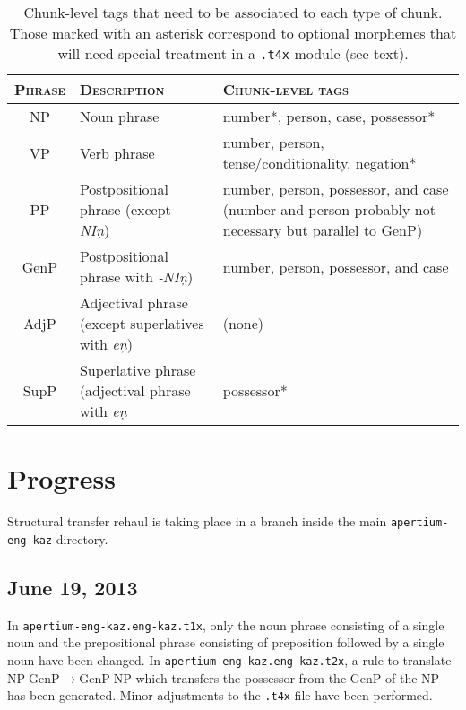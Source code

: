 \documentclass{article}
\begin{document}
\begin{table}
\begin{center}
\begin{tabular}{c|p{4cm}|p{5.6cm}}
\hline\hline
\textsc{Phrase} & \textsc{Description} & \textsc{Chunk-level tags} \\\hline
NP & Noun phrase & number*, person, case, possessor* \\
VP & Verb phrase & number, person, tense/conditionality, negation* \\ 
PP & Postpositional phrase (except \emph{-NI\c{n}}) & number, person, possessor, and case (number and person probably not necessary but parallel to GenP) \\
GenP & Postpositional phrase with \emph{-NI\c{n}}) & number, person, possessor, and case \\
AdjP & Adjectival phrase (except superlatives with \emph{e\c{n}}) & (none) \\
SupP & Superlative phrase (adjectival phrase with \emph{e\c{n}} & possessor* \\\hline
\end{tabular}
\end{center}
\caption{Chunk-level tags that need to be associated to each type of chunk. Those marked with an asterisk correspond to optional morphemes that will need special treatment in a \texttt{.t4x} module (see text).}
\end{table}

\section{Progress}
Structural transfer rehaul is taking place in a branch inside the main
\texttt{apertium-eng-kaz} directory.

\subsection{June 19, 2013}

In \texttt{apertium-eng-kaz.eng-kaz.t1x}, only the noun phrase consisting of a single noun and the prepositional phrase consisting of preposition followed by a single noun have been changed. In \texttt{apertium-eng-kaz.eng-kaz.t2x}, a rule to translate \(\mathrm{NP}\;\mathrm{GenP}\to\mathrm{GenP}\;\mathrm{NP}\) which transfers the possessor from the \(\mathrm{GenP}\)
 of the \(\mathrm{NP}\) has been generated. Minor adjustments to the \texttt{.t4x} file have been performed.
\end{document}
